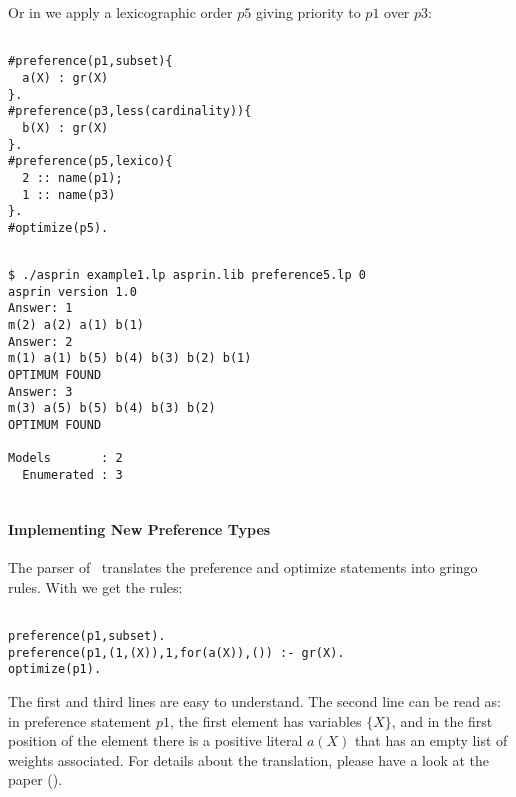 Or in  we apply a lexicographic order $p5$ giving priority to $p1$ over $p3$: 
\begin{lstlisting}[numbers=none]

#preference(p1,subset){                                                                                             
  a(X) : gr(X)                                                                                                    
}.
#preference(p3,less(cardinality)){                                                                                             
  b(X) : gr(X)                                                                                                    
}.
#preference(p5,lexico){
  2 :: name(p1);
  1 :: name(p3)
}.
#optimize(p5).
\end{lstlisting}
\begin{lstlisting}[numbers=none]

$ ./asprin example1.lp asprin.lib preference5.lp 0
asprin version 1.0
Answer: 1
m(2) a(2) a(1) b(1)
Answer: 2
m(1) a(1) b(5) b(4) b(3) b(2) b(1)
OPTIMUM FOUND
Answer: 3
m(3) a(5) b(5) b(4) b(3) b(2)
OPTIMUM FOUND

Models       : 2
  Enumerated : 3
  
\end{lstlisting}

\paragraph{Implementing New Preference Types}

The parser of \asprin\ translates the preference and optimize statements into gringo rules.  
With  we get the rules: 
\begin{lstlisting}[numbers=none]

preference(p1,subset).
preference(p1,(1,(X)),1,for(a(X)),()) :- gr(X).
optimize(p1).
\end{lstlisting}

The first and third lines are easy to understand. 
The second line can be read as: in preference statement $p1$, the first element has variables $\{X\}$,  
and in the first position of the element there is a positive literal $a(X)$  that has an empty list of weights associated. 
For details about the translation, please have a look at the paper (\cite{brderosc15a}). 

